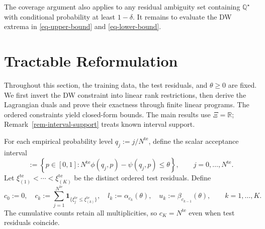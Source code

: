 \documentclass[review,11pt,3p,authoryear,nopreprintline]{elsarticle}
\begin{document}
The coverage argument also applies to any residual ambiguity set containing $\mathbb Q^\star$ with conditional probability at least $1-\delta$. It remains to evaluate the DW extrema in \eqref{eq-upper-bound} and \eqref{eq-lower-bound}.


\section{Tractable Reformulation}
\label{sec-reformulation}

Throughout this section, the training data, the test residuals, and $\theta\ge0$ are fixed. We first invert the DW constraint into linear rank restrictions, then derive the Lagrangian duals and prove their exactness through finite linear programs. The ordered constraints yield closed-form bounds. The main results use $\Xi=\mathbb R$; Remark~\ref{rem-interval-support} treats known interval support.

For each empirical probability level $q_j:=j/N^{\mathrm{te}}$, define the scalar acceptance interval
\begin{equation}
  [\alpha_j(\theta),\beta_j(\theta)]
  :=\left\{p\in[0,1]:
  N^{\mathrm{te}}\phi(q_j,p)-\psi(q_j,p)\le\theta\right\},
  \qquad j=0,\ldots,N^{\mathrm{te}}.
  \label{eq-dw-rank-acceptance}
\end{equation}
Let $\xi_{(1)}^{\mathrm{te}}<\cdots<\xi_{(K)}^{\mathrm{te}}$ be the distinct ordered test residuals. Define
\begin{equation} 
    c_0 :=0, \quad
    c_k :=\sum_{j=1}^{N^{\mathrm{te}}}\mathbf1_{\{\xi_j^{\mathrm{te}}\le\xi_{(k)}^{\mathrm{te}}\}}, \quad
    l_k :=\alpha_{c_k}(\theta),  \quad
    u_k :=\beta_{c_{k-1}}(\theta),\qquad k=1,\ldots,K.
  \label{eq-dw-counts-and-levels}
\end{equation}
The cumulative counts retain all multiplicities, so $c_K=N^{\mathrm{te}}$ even when test residuals coincide.
\end{document}
